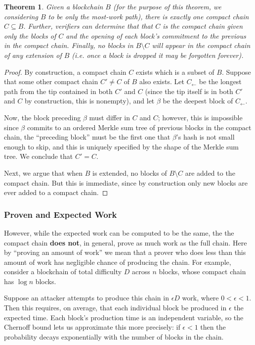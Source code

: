 \documentclass[letterpaper]{article}
\newtheorem{thrm}{Theorem}
\begin{document}
\begin{thrm} Given a blockchain $B$ (for the purpose of this theorem, we
considering $B$ to be only the most-work path), there is exactly one compact
chain $C\subseteq B$. Further, verifiers can determine that that $C$ is the
compact chain given only the blocks of $C$ and the opening of each
block's commitment to the previous in the compact chain. Finally, no
blocks in $B\setminus C$ will appear in the compact chain of any extension
of $B$ (i.e. once a block is dropped it may be forgotten forever).
\label{cc_unique}\end{thrm}
\begin{proof}
By construction, a compact chain $C$ exists which is a subset of $B$.
Suppose that some other compact chain $C'\neq C$ of $B$ also exists.
Let $C_\gets$ be the longest path from the tip contained in both
$C'$ and $C$ (since the tip itself is in both $C'$ and $C$ by construction,
this is nonempty), and let $\beta$ be the deepest block of $C_\gets$.

Now, the block preceding $\beta$ must differ in $C$ and $C$; however,
this is impossible since $\beta$ commits to an ordered Merkle sum tree of
previous blocks in the compact chain, the ``preceding block'' must
be the first one that $\beta$'s hash is not small enough to skip,
and this is uniquely specified by the shape of the Merkle sum tree.
We conclude that $C' = C$.

Next, we argue that when $B$ is extended, no blocks of $B\setminus C$
are added to the compact chain. But this is immediate, since by
construction only new blocks are ever added to a compact chain.
\end{proof}

\subsubsection{Proven and Expected Work\label{proven_expected}}

However, while the expected work can be computed to be the same, the
the compact chain \textbf{does not}, in general, prove as much work as
the full chain. Here by ``proving an amount of work'' we mean that a
prover who does less than this amount of work has negligible chance
of producing the chain.
For example, consider a blockchain of total difficulty
$D$ across $n$ blocks, whose compact chain has $\log n$ blocks.

Suppose an attacker attempts to produce this chain in $\epsilon D$ work,
where $0<\epsilon<1$. Then this requires, on average, that each individual
block be produced in $\epsilon$ the expected time. Each block's production
time is an independent variable, so the Chernoff bound lets us approximate
this more precisely: if $\epsilon < 1$ then the probability decays
exponentially with the number of blocks in the chain.
\end{document}
